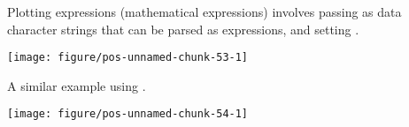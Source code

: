 \documentclass[paper=a4,10pt,div=17,headsepline,BCOR=12mm,twoside,open=right]{scrbook}\usepackage{knitr}
\begin{document}
Plotting expressions (mathematical expressions) involves passing as  data character strings that can be parsed as expressions, and setting .

\begin{knitrout}\footnotesize
{}\color{fgcolor}\begin{kframe}
\begin{alltt}
 \hlkwb{<-}
  \hlstd{(}\hlstd{=}\hlopt{:}\hlstd{,} \hlstd{=}\hlstd{(}\hlstd{,} \hlstd{),}
             \hlstd{=}\hlstd{(}\hlstr{"alpha["}\hlstd{,} \hlopt{:}\hlstd{,} \hlstr{"]"}\hlstd{,}  \hlstd{=} \hlstd{))}

  \hlopt{+}
  \hlstd{(}\hlstd{=}\hlopt{-}\hlstd{,} \hlstd{=}\hlstd{,}  \hlstd{=} \hlstd{(}\hlstd{))} \hlopt{+}
  \hlstd{()}
\end{alltt}
\end{kframe}

{\centering \texttt{[image: figure/pos-unnamed-chunk-53-1]} 

}



\end{knitrout}

A similar example using .

\begin{knitrout}\footnotesize
{}\color{fgcolor}\begin{kframe}
\begin{alltt}
    \hlopt{+}
  \hlstd{(} \hlstd{=} \hlopt{-}\hlstd{,}  \hlstd{=} \hlstd{,}  \hlstd{=} \hlstd{(}\hlstd{),}
              \hlstd{=} \hlstd{,}  \hlstd{=} \hlstd{)} \hlopt{+}
  \hlstd{()}
\end{alltt}
\end{kframe}

{\centering \texttt{[image: figure/pos-unnamed-chunk-54-1]} 

}



\end{knitrout}
\end{document}
